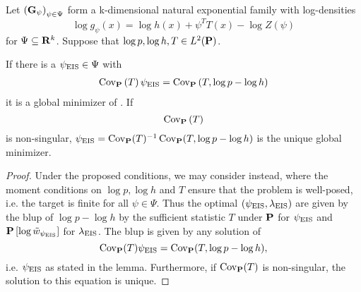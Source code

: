 \begin{lemma}
    \label{prop:eis_exponential_families}
    Let $\left( \G_{\psi} \right)_{\psi \in \Psi}$ form a k-dimensional natural exponential family with log-densities 
    $$
        \log g_{\psi}(x) = \log h(x) + \psi^{T} T(x) - \log Z(\psi)
    $$
    for $\Psi \subseteq \R^{k}$. Suppose that $\log p, \log h, T \in L^{2}(\P)$. 

    If there is a $\peis \in \Psi$ with
    \begin{align}
        \label{eq:peis-analytical}
        \cov_{\P} \left( T \right)\peis = \cov_{\P} \left(T, \log p - \log h \right)
    \end{align}
    it is a global minimizer of . If
    $$
    \cov_{\P} \left( T \right)
    $$
    is non-singular, $\peis = \cov_{\P} (T) ^{-1} \cov _{\P} (T, \log p - \log h)$ is the unique global minimizer.
\end{lemma}

\begin{proof}
    Under the proposed conditions, we may consider  instead, where the moment conditions on $\log p, \log h$ and $T$ ensure that the problem is well-posed, i.e. the target is finite for all $\psi \in \Psi$. 
    Thus the optimal $ \left( \peis, \lambda_{\eis} \right)$ are given by the \gls{blup} of $\log p - \log h$ by the sufficient statistic $T$ under $\P$ for $\peis$ and $\P \left[ \log \tilde w_{\peis} \right]$ for $\lambda_{\eis}$. The \acrshort{blup} is given by any solution of
    $$
        \cov_{\P} (T) \peis = \cov_{\P} (T, \log p - \log h),
    $$
    i.e. $\peis$ as stated in the lemma. Furthermore, if $\cov_{\P} (T)$ is non-singular, the solution to this equation is unique.
    
\end{proof}

